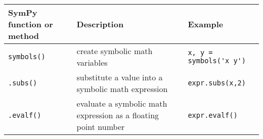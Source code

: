 \documentclass{book}
\newcommand{\passthrough}[1]{#1}
\begin{document}
\begin{longtable}[]{@{}lll@{}}
\toprule
\begin{minipage}[b]{0.30\columnwidth}\raggedright
SymPy function or method\strut
\end{minipage} & \begin{minipage}[b]{0.30\columnwidth}\raggedright
Description\strut
\end{minipage} & \begin{minipage}[b]{0.30\columnwidth}\raggedright
Example\strut
\end{minipage}\tabularnewline
\midrule
\endhead
\begin{minipage}[t]{0.30\columnwidth}\raggedright
\passthrough{\lstinline!symbols()!}\strut
\end{minipage} & \begin{minipage}[t]{0.30\columnwidth}\raggedright
create symbolic math variables\strut
\end{minipage} & \begin{minipage}[t]{0.30\columnwidth}\raggedright
\passthrough{\lstinline!x, y = symbols('x y')!}\strut
\end{minipage}\tabularnewline
\begin{minipage}[t]{0.30\columnwidth}\raggedright
\passthrough{\lstinline!.subs()!}\strut
\end{minipage} & \begin{minipage}[t]{0.30\columnwidth}\raggedright
substitute a value into a symbolic math expression\strut
\end{minipage} & \begin{minipage}[t]{0.30\columnwidth}\raggedright
\passthrough{\lstinline!expr.subs(x,2)!}\strut
\end{minipage}\tabularnewline
\begin{minipage}[t]{0.30\columnwidth}\raggedright
\passthrough{\lstinline!.evalf()!}\strut
\end{minipage} & \begin{minipage}[t]{0.30\columnwidth}\raggedright
evaluate a symbolic math expression as a floating point number\strut
\end{minipage} & \begin{minipage}[t]{0.30\columnwidth}\raggedright
\passthrough{\lstinline!expr.evalf()!}\strut
\end{minipage}\tabularnewline
\bottomrule
\end{longtable}
    
\end{document}
